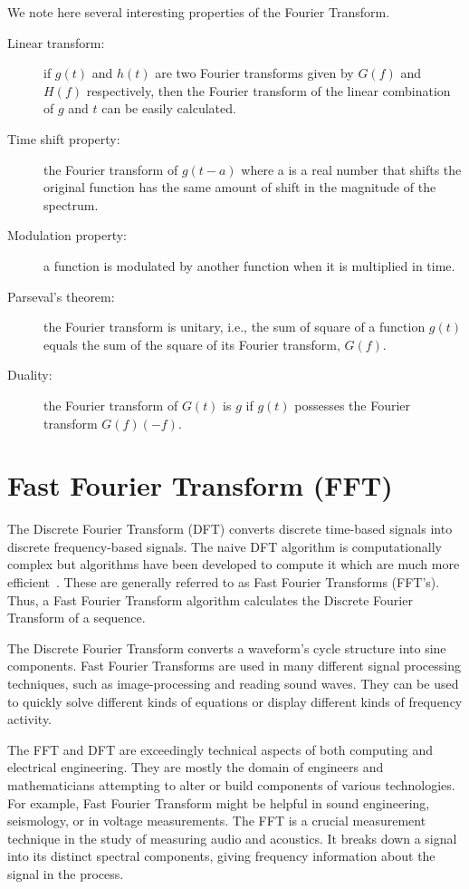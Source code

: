\documentclass[a4paper, 12pt]{scrartcl}
\begin{document}
We note here several interesting properties of the Fourier Transform.
\begin{description}
  \item[Linear transform:] if $g(t)$ and $h(t)$ are two Fourier transforms given by $G(f)$ and $H(f)$ respectively, then the Fourier transform of the linear combination of $g$ and $t$ can be easily calculated.
  \item[Time shift property:] the Fourier transform of $g(t - a)$ where a is a real number that shifts the original function has the same amount of shift in the magnitude of the spectrum.
  \item[Modulation property:] a function is modulated by another function when it is multiplied in time.
  \item[Parseval's theorem:] the Fourier transform is unitary, i.e., the sum of square of a function $g(t)$ equals the sum of the square of its Fourier transform, $G(f)$.
  \item[Duality:] the Fourier transform of $G(t)$ is $g$ if $g(t)$ possesses the Fourier transform $G(f) (-f)$.
\end{description}


\section{Fast Fourier Transform (FFT)}

The Discrete Fourier Transform (DFT) converts discrete time-based signals into discrete frequency-based signals.
The naive DFT algorithm is computationally complex but algorithms have been developed to compute it which are much more efficient~\cite{FFT}.
These are generally referred to as Fast Fourier Transforms (FFT's).
Thus, a Fast Fourier Transform algorithm calculates the Discrete Fourier Transform of a sequence.

The Discrete Fourier Transform converts a waveform's cycle structure into sine components.
Fast Fourier Transforms are used in many different signal processing techniques, such as image-processing and reading sound waves.
They can be used to quickly solve different kinds of equations or display different kinds of frequency activity.

The FFT and DFT are exceedingly technical aspects of both computing and electrical engineering.
They are mostly the domain of engineers and mathematicians attempting to alter or build components of various technologies.
For example, Fast Fourier Transform might be helpful in sound engineering, seismology, or in voltage measurements.
The FFT is a crucial measurement technique in the study of measuring audio and acoustics.
It breaks down a signal into its distinct spectral components, giving frequency information about the signal in the process.
\end{document}
